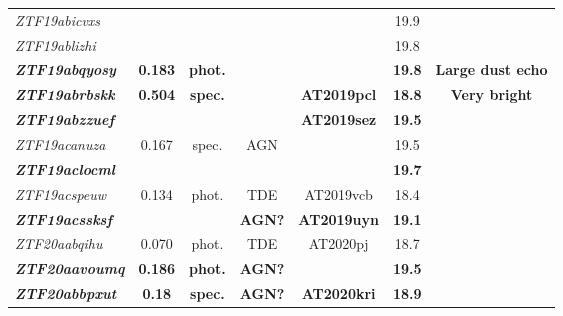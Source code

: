 \begin{table*}
\begin{tabular}{l  c  c  c   c  c  c}
    \textit{ZTF19abicvxs}          & ~              & ~              & ~                       & ~                   & 19.9                       &                                     \\
    \textit{ZTF19ablizhi}          & ~              & ~              & ~                       & ~                   & 19.8                       &                                     \\
    \textbf{\textit{ZTF19abqyosy}} & \textbf{0.183} & \textbf{phot.} & ~                       & ~                   & \textbf{19.8}              & \textbf{Large dust echo}            \\
    \textbf{\textit{ZTF19abrbskk}} & \textbf{0.504} & \textbf{spec.} & ~                       & \textbf{AT2019pcl}  & \textbf{18.8}              & \textbf{Very bright}                \\
    \textbf{\textit{ZTF19abzzuef}} & ~              & ~              & ~                       & \textbf{AT2019sez}  & \textbf{19.5}              &                                     \\
    \textit{ZTF19acanuza}          & 0.167          & spec.          & AGN                     & ~                   & 19.5                       &                                     \\
    \textbf{\textit{ZTF19aclocml}} & ~              & ~              & ~                       & ~                   & \textbf{19.7}              &                                     \\
    \textit{ZTF19acspeuw}          & 0.134          & phot.          & TDE                     & AT2019vcb           & 18.4                       &                                     \\
    \textbf{\textit{ZTF19acssksf}} & ~              & ~              & \textbf{ AGN?}          & \textbf{AT2019uyn}  & \textbf{19.1}              &                                     \\
    \textit{ZTF20aabqihu}          & 0.070          & phot.          & TDE                     & AT2020pj            & 18.7                       &                                     \\
    \textbf{\textit{ZTF20aavoumq}} & \textbf{0.186} & \textbf{phot.} & \textbf{AGN?}           & ~                   & \textbf{19.5}              &                                     \\
    \textbf{\textit{ZTF20abbpxut}} & \textbf{0.18}  & \textbf{spec.} & \textbf{AGN?}           & \textbf{AT2020kri}  & \textbf{18.9}              &                                     \\

\end{tabular}
\end{table*}
